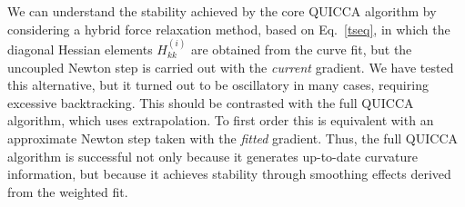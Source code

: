 \documentclass[prl,twocolumn,showpacs,twocolumngrid,superbib]{revtex4}
\begin{document}
We can understand the stability achieved by the core QUICCA
algorithm by considering a hybrid force relaxation method, based on Eq.~\ref{tseq},
in which the diagonal Hessian elements $H^{(i)}_{kk}$ are obtained from the 
curve fit, but the uncoupled Newton step is carried out with the {\em current} 
gradient.  We have tested this alternative, but it turned out to be oscillatory 
in many cases, requiring excessive backtracking.  This should be contrasted with the
full QUICCA algorithm, which uses extrapolation. To first order this is equivalent with 
an approximate Newton step taken with the {\em fitted} gradient.   Thus, the full 
QUICCA algorithm is successful not only because it generates up-to-date curvature information, 
but because it achieves stability through smoothing effects derived from the weighted fit.
\end{document}

